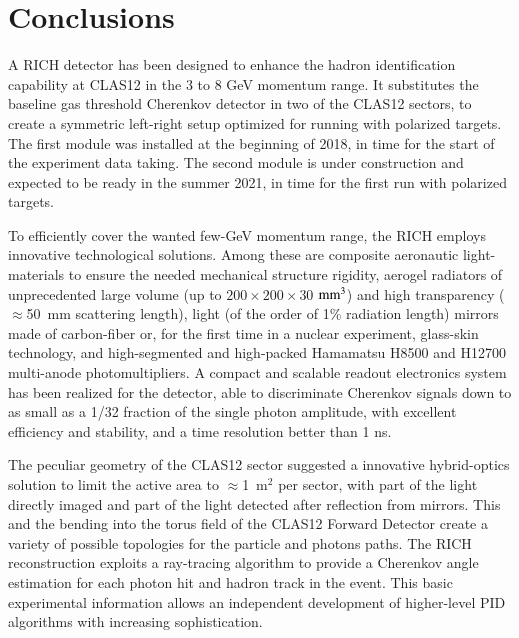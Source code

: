 \documentclass[5p,times,twocolumn]{elsarticle}
\begin{document}
\section{Conclusions}

A RICH detector has been designed to enhance the hadron identification capability 
at CLAS12 in the 3 to 8 GeV momentum range. It substitutes the baseline gas threshold Cherenkov detector 
in two of the CLAS12 sectors, to create a symmetric left-right setup 
optimized for running with polarized targets. The first module was
installed at the beginning of 2018, in time for the start of the experiment data 
taking. The second module is under construction and expected to be ready in 
the summer 2021, in time for the first run with polarized targets.

To efficiently cover the wanted few-GeV momentum range, the RICH employs 
innovative technological solutions. Among these are composite 
aeronautic light-materials to ensure the needed mechanical structure rigidity, 
aerogel radiators of unprecedented large volume (up to $200 \times 200 \times 30$ $\rm mm^3$) 
and high transparency ($\approx$50~mm scattering length), light 
(of the order of 1\% radiation length) mirrors made of carbon-fiber or, for
the first time in a nuclear experiment, glass-skin technology, and
high-segmented and high-packed Hamamatsu H8500 and H12700 multi-anode photomultipliers.
A compact and scalable readout electronics system has been realized for 
the detector, able to discriminate Cherenkov signals down to as small as a 1/32 fraction
of the single photon amplitude, with excellent efficiency and stability,
and a time resolution better than 1 ns.

The peculiar geometry of the CLAS12 sector suggested a innovative 
hybrid-optics solution to limit the active area to $\approx$1~m$^2$ per sector, with part of the light directly
imaged and part of the light detected after reflection from mirrors. This and the bending into
the torus field of the CLAS12 Forward Detector create a variety of
possible topologies for the particle and photons paths. 
The RICH reconstruction exploits a ray-tracing algorithm to provide a
Cherenkov angle estimation for each photon hit and hadron track in 
the event. This basic experimental information allows an independent 
development of higher-level PID algorithms with increasing sophistication.
\end{document}
